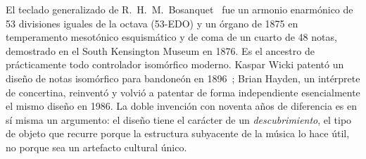 \documentclass[10pt,letterpaper,twocolumn]{article}
\begin{document}
El teclado generalizado de R.\ H.\ M.\ Bosanquet~\citep{bosanquet1875generalized} fue un armonio enarmónico de 53 divisiones iguales de la octava (53-EDO) y un órgano de 1875 en temperamento mesotónico esquismático y de coma de un cuarto de 48 notas, demostrado en el South Kensington Museum en 1876. Es el ancestro de prácticamente todo controlador isomórfico moderno. Kaspar Wicki patentó un diseño de notas isomórfico para bandoneón en 1896~\citep{wicki1896}; Brian Hayden, un intérprete de concertina, reinventó y volvió a patentar de forma independiente esencialmente el mismo diseño en 1986. La doble invención con noventa años de diferencia es en sí misma un argumento: el diseño tiene el carácter de un \emph{descubrimiento}, el tipo de objeto que recurre porque la estructura subyacente de la música lo hace útil, no porque sea un artefacto cultural único.
\end{document}

